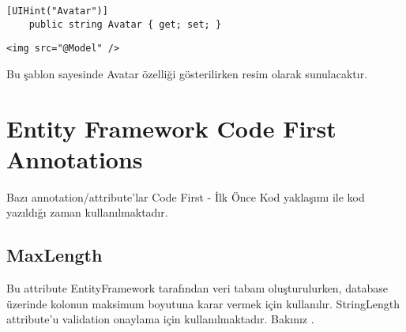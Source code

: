 \documentclass[10pt,a4paper]{article}
\begin{document}
\begin{lstlisting}[label=code-UIHintOrnek1,caption=UIHint Örnek1]
	[UIHint("Avatar")]
	public string Avatar { get; set; }
\end{lstlisting}


\begin{lstlisting}[label=code-UIHintOrnek cshtml,caption=UIHint cshtml]
	<img src="@Model" />
\end{lstlisting}

Bu şablon sayesinde Avatar özelliği gösterilirken resim olarak sunulacaktır.



\section{Entity Framework Code First Annotations}

Bazı annotation/attribute'lar Code First - İlk Önce Kod yaklaşımı ile
kod yazıldığı zaman kullanılmaktadır.

\subsection{MaxLength}
Bu attribute EntityFramework tarafından veri tabanı oluşturulurken,
database üzerinde kolonun maksimum boyutuna karar vermek için kullanılır.
StringLength attribute'u validation onaylama için kullanılmaktadır.
Bakınız \cite{StackOverflow2011StringLength}.








% 

\end{document}
